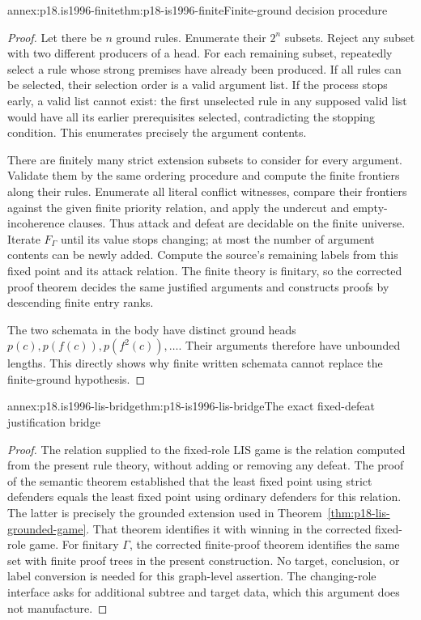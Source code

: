 \begin{annexitem}{annex:p18.is1996-finite}{thm:p18-is1996-finite}{Finite-ground decision procedure}
\begin{proof}
Let there be \(n\) ground rules.
Enumerate their \(2^n\) subsets.
Reject any subset with two different producers of a head.
For each remaining subset, repeatedly select a rule whose
strong premises have already been produced.
If all rules can be selected, their selection order is
a valid argument list.
If the process stops early, a valid list cannot exist:
the first unselected rule in any supposed valid list
would have all its earlier prerequisites selected, contradicting
the stopping condition.
This enumerates precisely the argument contents.

There are finitely many strict extension subsets to consider
for every argument. Validate them by the same ordering
procedure and compute the finite frontiers along their rules.
Enumerate all literal conflict witnesses, compare their
frontiers against the given finite priority relation,
and apply the undercut and empty-incoherence clauses.
Thus attack and defeat are decidable on the finite universe.
Iterate \(F_\Gamma\) until its value stops changing;
at most the number of argument contents can be newly added.
Compute the source's remaining labels from this fixed point
and its attack relation.
The finite theory is finitary, so the corrected proof theorem
decides the same justified arguments and constructs proofs
by descending finite entry ranks.

The two schemata in the body have distinct ground heads
\(p(c),p(f(c)),p(f^2(c)),\ldots\).
Their arguments therefore have unbounded lengths.
This directly shows why finite written schemata cannot
replace the finite-ground hypothesis.
\end{proof}
\end{annexitem}

\begin{annexitem}{annex:p18.is1996-lis-bridge}{thm:p18-is1996-lis-bridge}{The exact fixed-defeat justification bridge}
\begin{proof}
The relation supplied to the fixed-role LIS game is the
relation computed from the present rule theory, without
adding or removing any defeat.
The proof of the semantic theorem established that the
least fixed point using strict defenders equals the
least fixed point using ordinary defenders for this relation.
The latter is precisely the grounded extension used in
Theorem~\ref{thm:p18-lis-grounded-game}.
That theorem identifies it with winning in the corrected
fixed-role game. For finitary \(\Gamma\), the corrected
finite-proof theorem identifies the same set with finite
proof trees in the present construction.
No target, conclusion, or label conversion is needed for
this graph-level assertion.
The changing-role interface asks for additional subtree
and target data, which this argument does not manufacture.
\end{proof}
\end{annexitem}
